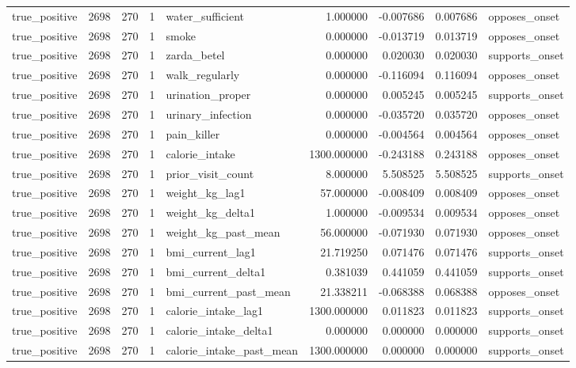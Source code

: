 \begin{longtable}{lrrrlrrrl}
true\_positive & 2698 & 270 & 1 & water\_sufficient & 1.000000 & -0.007686 & 0.007686 & opposes\_onset \\
true\_positive & 2698 & 270 & 1 & smoke & 0.000000 & -0.013719 & 0.013719 & opposes\_onset \\
true\_positive & 2698 & 270 & 1 & zarda\_betel & 0.000000 & 0.020030 & 0.020030 & supports\_onset \\
true\_positive & 2698 & 270 & 1 & walk\_regularly & 0.000000 & -0.116094 & 0.116094 & opposes\_onset \\
true\_positive & 2698 & 270 & 1 & urination\_proper & 0.000000 & 0.005245 & 0.005245 & supports\_onset \\
true\_positive & 2698 & 270 & 1 & urinary\_infection & 0.000000 & -0.035720 & 0.035720 & opposes\_onset \\
true\_positive & 2698 & 270 & 1 & pain\_killer & 0.000000 & -0.004564 & 0.004564 & opposes\_onset \\
true\_positive & 2698 & 270 & 1 & calorie\_intake & 1300.000000 & -0.243188 & 0.243188 & opposes\_onset \\
true\_positive & 2698 & 270 & 1 & prior\_visit\_count & 8.000000 & 5.508525 & 5.508525 & supports\_onset \\
true\_positive & 2698 & 270 & 1 & weight\_kg\_lag1 & 57.000000 & -0.008409 & 0.008409 & opposes\_onset \\
true\_positive & 2698 & 270 & 1 & weight\_kg\_delta1 & 1.000000 & -0.009534 & 0.009534 & opposes\_onset \\
true\_positive & 2698 & 270 & 1 & weight\_kg\_past\_mean & 56.000000 & -0.071930 & 0.071930 & opposes\_onset \\
true\_positive & 2698 & 270 & 1 & bmi\_current\_lag1 & 21.719250 & 0.071476 & 0.071476 & supports\_onset \\
true\_positive & 2698 & 270 & 1 & bmi\_current\_delta1 & 0.381039 & 0.441059 & 0.441059 & supports\_onset \\
true\_positive & 2698 & 270 & 1 & bmi\_current\_past\_mean & 21.338211 & -0.068388 & 0.068388 & opposes\_onset \\
true\_positive & 2698 & 270 & 1 & calorie\_intake\_lag1 & 1300.000000 & 0.011823 & 0.011823 & supports\_onset \\
true\_positive & 2698 & 270 & 1 & calorie\_intake\_delta1 & 0.000000 & 0.000000 & 0.000000 & supports\_onset \\
true\_positive & 2698 & 270 & 1 & calorie\_intake\_past\_mean & 1300.000000 & 0.000000 & 0.000000 & supports\_onset \\

\end{longtable}
